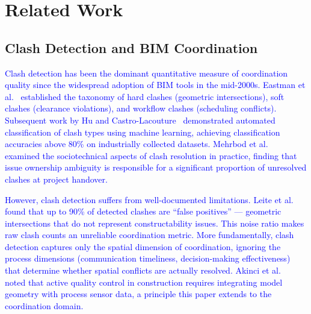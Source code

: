 \documentclass[conference]{IEEEtran}
\newcommand{\placeholder}[1]{\textcolor{blue}{#1}}
\begin{document}
\section{Related Work}

\subsection{Clash Detection and BIM Coordination}
\placeholder{
Clash detection has been the dominant quantitative measure of coordination quality since the widespread adoption of BIM tools in the mid-2000s. Eastman et al.~\cite{eastman2011} established the taxonomy of hard clashes (geometric intersections), soft clashes (clearance violations), and workflow clashes (scheduling conflicts). Subsequent work by Hu and Castro-Lacouture~\cite{hu2019} demonstrated automated classification of clash types using machine learning, achieving classification accuracies above 80\% on industrially collected datasets. Mehrbod et al.~\cite{mehrbod2019} examined the sociotechnical aspects of clash resolution in practice, finding that issue ownership ambiguity is responsible for a significant proportion of unresolved clashes at project handover.

However, clash detection suffers from well-documented limitations. Leite et al.~\cite{leite2011} found that up to 90\% of detected clashes are ``false positives'' --- geometric intersections that do not represent constructability issues. This noise ratio makes raw clash counts an unreliable coordination metric. More fundamentally, clash detection captures only the spatial dimension of coordination, ignoring the process dimensions (communication timeliness, decision-making effectiveness) that determine whether spatial conflicts are actually resolved. Akinci et al.~\cite{akinci2006} noted that active quality control in construction requires integrating model geometry with process sensor data, a principle this paper extends to the coordination domain.
}
\end{document}
